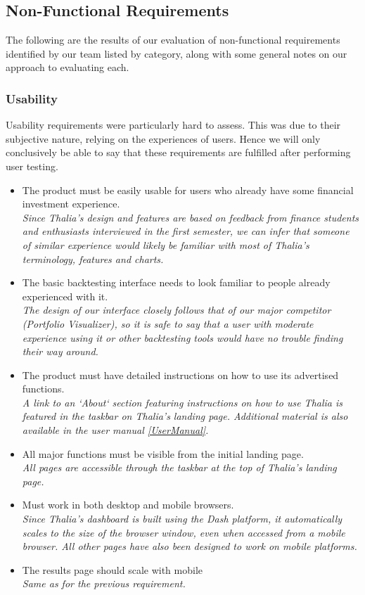 \documentclass[main.tex]{subfiles}
\begin{document}
\subsection{Non-Functional Requirements}
The following are the results of our evaluation of non-functional requirements identified by our team listed by category, along with some general notes on our approach to evaluating each.

\subsubsection{Usability}
Usability requirements were particularly hard to assess. This was due to their subjective nature, relying on the experiences of users. Hence we will only conclusively be able to say that these requirements are fulfilled after performing user testing.

\begin{itemize}

\item The product must be easily usable for users who already have some ﬁnancial investment experience.\\
\textit{Since Thalia’s design and features are based on feedback from finance students and enthusiasts interviewed in the first semester, we can infer that someone of similar experience would likely be familiar with most of Thalia's terminology, features and charts.}
\item The basic backtesting interface needs to look familiar to people already experienced with it. \\
\textit{The design of our interface closely follows that of our major competitor (Portfolio Visualizer), so it is safe to say that a user with moderate experience using it or other backtesting tools would have no trouble finding their way around.}

\item The product must have detailed instructions on how to use its advertised functions.\\
\textit{A link to an `About` section featuring instructions on how to use Thalia is featured in the taskbar on Thalia’s landing page. Additional material is also available in the user manual \ref{UserManual}.}
\item All major functions must be visible from the initial landing page.\\
\textit{All pages are accessible through the taskbar at the top of Thalia’s landing page.}
\item Must work in both desktop and mobile browsers.\\
\textit{Since Thalia’s dashboard is built using the Dash platform, it automatically scales to the size of the browser window, even when accessed from a mobile browser. All other pages have also been designed to work on mobile platforms.}
\item The results page should scale with mobile\\
\textit{Same as for the previous requirement.}

\end{itemize}
\end{document}
